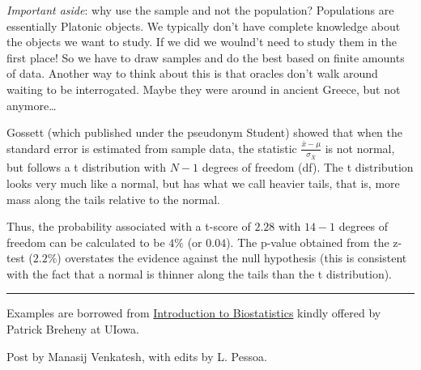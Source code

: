\documentclass[]{book}
\begin{document}
\emph{Important aside}: why use the sample and not the population?
Populations are essentially Platonic objects. We typically don't have
complete knowledge about the objects we want to study. If we did we
woulnd't need to study them in the first place! So we have to draw
samples and do the best based on finite amounts of data. Another way to
think about this is that oracles don't walk around waiting to be
interrogated. Maybe they were around in ancient Greece, but not
anymore\ldots{}

Gossett (which published under the pseudonym Student) showed that when
the standard error is estimated from sample data, the statistic
\(\frac{\bar{x} - \mu}{\sigma_{\bar{X}}}\) is not normal, but follows a
t distribution with \(N - 1\) degrees of freedom (df). The t
distribution looks very much like a normal, but has what we call heavier
tails, that is, more mass along the tails relative to the normal.

Thus, the probability associated with a t-score of \(2.28\) with
\(14 - 1\) degrees of freedom can be calculated to be \(4\%\) (or
\(0.04\)). The p-value obtained from the z-test (\(2.2\%\)) overstates
the evidence against the null hypothesis (this is consistent with the
fact that a normal is thinner along the tails than the t distribution).

\begin{center}\rule{0.5\linewidth}{\linethickness}\end{center}

Examples are borrowed from
\href{http://myweb.uiowa.edu/pbreheny/4120/s18/index.html}{Introduction
to Biostatistics} kindly offered by Patrick Breheny at UIowa.

Post by Manasij Venkatesh, with edits by L. Pessoa.


\end{document}
